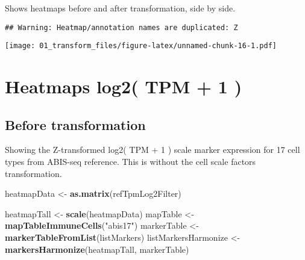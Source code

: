 \documentclass[
]{article}
\newenvironment{Shaded}{\begin{snugshade}}{\end{snugshade}}
\newcommand{\FunctionTok}[1]{\textcolor[rgb]{0.13,0.29,0.53}{\textbf{#1}}}
\newcommand{\NormalTok}[1]{#1}
\newcommand{\OtherTok}[1]{\textcolor[rgb]{0.56,0.35,0.01}{#1}}
\newcommand{\SpecialCharTok}[1]{\textcolor[rgb]{0.81,0.36,0.00}{\textbf{#1}}}
\newcommand{\StringTok}[1]{\textcolor[rgb]{0.31,0.60,0.02}{#1}}
\begin{document}
Shows heatmaps before and after transformation, side by side.

\begin{Shaded}
\end{Shaded}

\begin{verbatim}
## Warning: Heatmap/annotation names are duplicated: Z
\end{verbatim}

\texttt{[image: 01\_transform\_files/figure-latex/unnamed-chunk-16-1.pdf]}

\hypertarget{heatmaps-log2-tpm-1}{%
\section{Heatmaps log2( TPM + 1 )}\label{heatmaps-log2-tpm-1}}

\hypertarget{before-transformation-1}{%
\subsection{Before transformation}\label{before-transformation-1}}

Showing the Z-transformed log2( TPM + 1 ) scale marker expression for 17
cell types from ABIS-seq reference. This is without the cell scale
factors transformation.

\begin{Shaded}
\begin{Highlighting}[]
\NormalTok{heatmapData }\OtherTok{\textless{}{-}} \FunctionTok{as.matrix}\NormalTok{(refTpmLog2Filter)}
\end{Highlighting}
\end{Shaded}

\begin{Shaded}
\begin{Highlighting}[]
\NormalTok{heatmapTall }\OtherTok{\textless{}{-}} \FunctionTok{scale}\NormalTok{(heatmapData)}
\NormalTok{mapTable }\OtherTok{\textless{}{-}} \FunctionTok{mapTableImmuneCells}\NormalTok{(}\StringTok{"abis17"}\NormalTok{)}
\NormalTok{markerTable }\OtherTok{\textless{}{-}} \FunctionTok{markerTableFromList}\NormalTok{(listMarkers)}
\NormalTok{listMarkersHarmonize }\OtherTok{\textless{}{-}} \FunctionTok{markersHarmonize}\NormalTok{(heatmapTall, markerTable)}
\end{Highlighting}
\end{Shaded}
\end{document}
